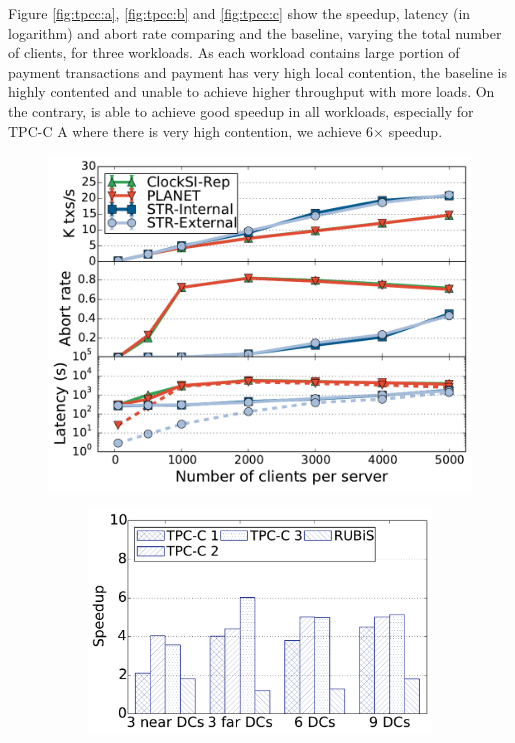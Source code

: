 Figure \ref{fig:tpcc:a}, \ref{fig:tpcc:b} and \ref{fig:tpcc:c} show the speedup, latency (in logarithm) and abort rate comparing \specula and the baseline, varying the total number of clients, for three workloads. As each workload contains large portion of payment transactions and payment has very high local contention, the baseline is highly contented and unable to achieve higher throughput with more loads. On the contrary, \specula is able to achieve good speedup in all workloads, especially for TPC-C A where there is very high contention, we achieve 6$\times$ speedup.

\iffalse
\begin{figure}
\centering
\begin{minipage}{.32\textwidth}
  \centering
  \vspace{-3mm}
  \includegraphics[scale=0.27]{figures/rubislatencywarehouse}
  \caption{Throughput of RUBiS workloads}
  \label{fig:rubis}
\end{minipage}
\begin{minipage}{.64\textwidth}
  \centering
    \begin{subfigure}{0.48\linewidth}
    \def\svgwidth{0.95\columnwidth}
    \includegraphics[scale=0.27]{figures/scale_dc}

\end{subfigure}
\end{minipage}
\end{figure}
